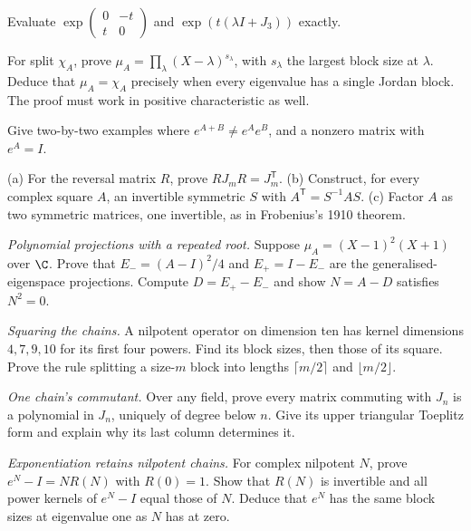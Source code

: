 \begin{exercise}[$\star$]\label{linear:ex:rotation}
Evaluate $\exp\begin{pmatrix}0&-t\\t&0\end{pmatrix}$ and $\exp(t(\lambda I+J_3))$ exactly.
\end{exercise}
\begin{exercise}[$\star\star$]\label{linear:ex:minpolyjordan}
For split $\chi_A$, prove $\mu_A=\prod_\lambda(X-\lambda)^{s_\lambda}$, with $s_\lambda$ the largest block size at $\lambda$. Deduce that $\mu_A=\chi_A$ precisely when every eigenvalue has a single Jordan block. The proof must work in positive characteristic as well.
\end{exercise}
\begin{exercise}[$\star\star$]\label{linear:ex:expsum}
Give two-by-two examples where $e^{A+B}\ne e^Ae^B$, and a nonzero matrix with $e^A=I$.
\end{exercise}
\begin{exercise}[$\star\star\star$]\label{linear:ex:symprod}
(a) For the reversal matrix $R$, prove $RJ_mR=J_m^{\mathsf T}$. (b) Construct, for every complex square $A$, an invertible symmetric $S$ with $A^{\mathsf T}=S^{-1}AS$. (c) Factor $A$ as two symmetric matrices, one invertible, as in Frobenius's 1910 theorem.
\end{exercise}

\begin{exercise}[$\star\star$]\label{ex:v8cCa}
\emph{Polynomial projections with a repeated root.} Suppose $\mu_A=(X-1)^2(X+1)$ over $\C$. Prove that $E_-=(A-I)^2/4$ and $E_+=I-E_-$ are the generalised-eigenspace projections. Compute $D=E_+-E_-$ and show $N=A-D$ satisfies $N^2=0$.
\end{exercise}
\begin{exercise}[$\star\star$]\label{ex:v8cCb}
\emph{Squaring the chains.} A nilpotent operator on dimension ten has kernel dimensions $4,7,9,10$ for its first four powers. Find its block sizes, then those of its square. Prove the rule splitting a size-$m$ block into lengths $\lceil m/2\rceil$ and $\lfloor m/2\rfloor$.
\end{exercise}
\begin{exercise}[$\star\star$]\label{ex:v8cCc}
\emph{One chain's commutant.} Over any field, prove every matrix commuting with $J_n$ is a polynomial in $J_n$, uniquely of degree below $n$. Give its upper triangular Toeplitz form and explain why its last column determines it.
\end{exercise}
\begin{exercise}[$\star\star$]\label{ex:v8cCd}
\emph{Exponentiation retains nilpotent chains.} For complex nilpotent $N$, prove $e^N-I=NR(N)$ with $R(0)=1$. Show that $R(N)$ is invertible and all power kernels of $e^N-I$ equal those of $N$. Deduce that $e^N$ has the same block sizes at eigenvalue one as $N$ has at zero.
\end{exercise}

